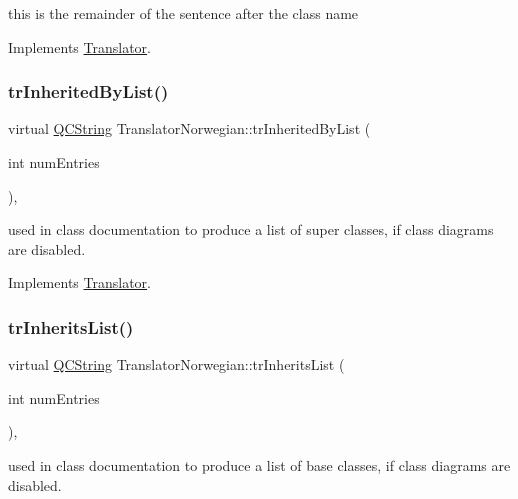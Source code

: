 this is the remainder of the sentence after the class name 

Implements \mbox{\hyperlink{class_translator}{Translator}}.

\mbox{\label{class_translator_norwegian_aa502aa5abad02bfb785ed1575f2d61ff}} 
\subsubsection{\texorpdfstring{trInheritedByList()}{trInheritedByList()}}
{\footnotesize\ttfamily virtual \mbox{\hyperlink{class_q_c_string}{Q\+C\+String}} Translator\+Norwegian\+::tr\+Inherited\+By\+List (\begin{DoxyParamCaption}\item[{int}]{num\+Entries }\end{DoxyParamCaption})\hspace{0.3cm}{\ttfamily [inline]}, {\ttfamily [virtual]}}

used in class documentation to produce a list of super classes, if class diagrams are disabled. 

Implements \mbox{\hyperlink{class_translator}{Translator}}.

\mbox{\label{class_translator_norwegian_a2b9e664b354be825117c1d2847f15e49}} 
\subsubsection{\texorpdfstring{trInheritsList()}{trInheritsList()}}
{\footnotesize\ttfamily virtual \mbox{\hyperlink{class_q_c_string}{Q\+C\+String}} Translator\+Norwegian\+::tr\+Inherits\+List (\begin{DoxyParamCaption}\item[{int}]{num\+Entries }\end{DoxyParamCaption})\hspace{0.3cm}{\ttfamily [inline]}, {\ttfamily [virtual]}}

used in class documentation to produce a list of base classes, if class diagrams are disabled. 


